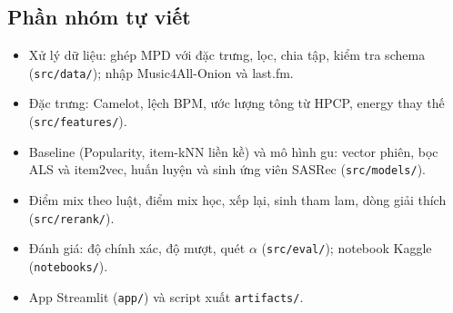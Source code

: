 \subsection{Phần nhóm tự viết}
\begin{itemize}
  \item Xử lý dữ liệu: ghép MPD với đặc trưng, lọc, chia tập, kiểm tra schema (\texttt{src/data/}); nhập Music4All-Onion và last.fm.
  \item Đặc trưng: Camelot, lệch BPM, ước lượng tông từ HPCP, energy thay thế (\texttt{src/features/}).
  \item Baseline (Popularity, item-kNN liền kề) và mô hình gu: vector phiên, bọc ALS và item2vec, huấn luyện và sinh ứng viên SASRec (\texttt{src/models/}).
  \item Điểm mix theo luật, điểm mix học, xếp lại, sinh tham lam, dòng giải thích (\texttt{src/rerank/}).
  \item Đánh giá: độ chính xác, độ mượt, quét $\alpha$ (\texttt{src/eval/}); notebook Kaggle (\texttt{notebooks/}).
  \item App Streamlit (\texttt{app/}) và script xuất \texttt{artifacts/}.
\end{itemize}
